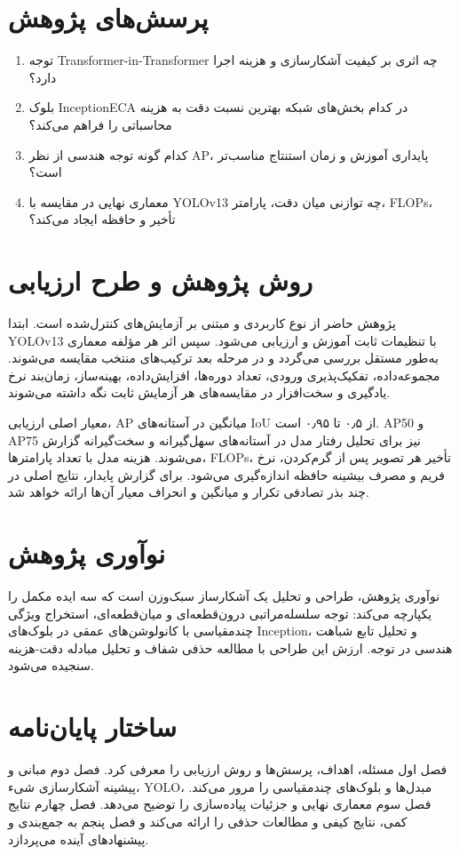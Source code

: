 \section{پرسش‌های پژوهش}
\begin{enumerate}
  \item توجه Transformer-in-Transformer چه اثری بر کیفیت آشکارسازی و هزینه اجرا دارد؟
  \item بلوک InceptionECA در کدام بخش‌های شبکه بهترین نسبت دقت به هزینه محاسباتی را فراهم می‌کند؟
  \item کدام گونه توجه هندسی از نظر AP، پایداری آموزش و زمان استنتاج مناسب‌تر است؟
  \item معماری نهایی در مقایسه با YOLOv13 چه توازنی میان دقت، پارامتر، FLOPs، تأخیر و حافظه ایجاد می‌کند؟
\end{enumerate}

\section{روش پژوهش و طرح ارزیابی}
پژوهش حاضر از نوع کاربردی و مبتنی بر آزمایش‌های کنترل‌شده است. ابتدا YOLOv13 با تنظیمات ثابت آموزش و ارزیابی می‌شود. سپس اثر هر مؤلفه معماری به‌طور مستقل بررسی می‌گردد و در مرحله بعد ترکیب‌های منتخب مقایسه می‌شوند. مجموعه‌داده، تفکیک‌پذیری ورودی، تعداد دوره‌ها، افزایش‌داده، بهینه‌ساز، زمان‌بند نرخ یادگیری و سخت‌افزار در مقایسه‌های هر آزمایش ثابت نگه داشته می‌شوند.

معیار اصلی ارزیابی، AP میانگین در آستانه‌های IoU از ۰٫۵ تا ۰٫۹۵ است. AP50 و AP75 نیز برای تحلیل رفتار مدل در آستانه‌های سهل‌گیرانه و سخت‌گیرانه گزارش می‌شوند. هزینه مدل با تعداد پارامترها، FLOPs، تأخیر هر تصویر پس از گرم‌کردن، نرخ فریم و مصرف بیشینه حافظه اندازه‌گیری می‌شود. برای گزارش پایدار، نتایج اصلی در چند بذر تصادفی تکرار و میانگین و انحراف معیار آن‌ها ارائه خواهد شد.

\section{نوآوری پژوهش}
نوآوری پژوهش، طراحی و تحلیل یک آشکارساز سبک‌وزن است که سه ایده مکمل را یکپارچه می‌کند: توجه سلسله‌مراتبی درون‌قطعه‌ای و میان‌قطعه‌ای، استخراج ویژگی چندمقیاسی با کانولوشن‌های عمقی در بلوک‌های Inception، و تحلیل تابع شباهت هندسی در توجه. ارزش این طراحی با مطالعه حذفی شفاف و تحلیل مبادله دقت-هزینه سنجیده می‌شود.

\section{ساختار پایان‌نامه}
فصل اول مسئله، اهداف، پرسش‌ها و روش ارزیابی را معرفی کرد. فصل دوم مبانی و پیشینه آشکارسازی شیء، YOLO، مبدل‌ها و بلوک‌های چندمقیاسی را مرور می‌کند. فصل سوم معماری نهایی و جزئیات پیاده‌سازی را توضیح می‌دهد. فصل چهارم نتایج کمی، نتایج کیفی و مطالعات حذفی را ارائه می‌کند و فصل پنجم به جمع‌بندی و پیشنهادهای آینده می‌پردازد.
